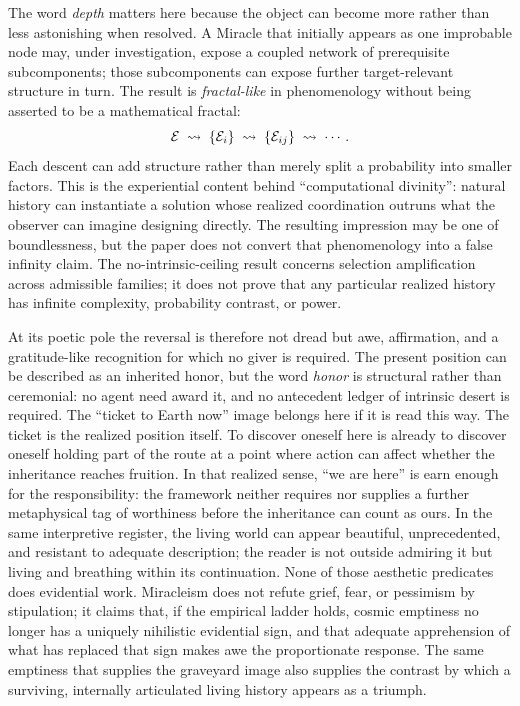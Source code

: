 The word \emph{depth} matters here because the object can become more
rather than less astonishing when resolved. A Miracle that initially
appears as one improbable node may, under investigation, expose a coupled
network of prerequisite subcomponents; those subcomponents can expose
further target-relevant structure in turn. The result is \emph{fractal-like}
in phenomenology without being asserted to be a mathematical fractal:
\[
\mathcal{E}\;\rightsquigarrow\;\{\mathcal{E}_i\}
\;\rightsquigarrow\;\{\mathcal{E}_{ij}\}\;\rightsquigarrow\;\cdots .
\]
Each descent can add structure rather than merely split a probability
into smaller factors. This is the experiential content behind
``computational divinity'': natural history can instantiate a solution
whose realized coordination outruns what the observer can imagine
designing directly. The resulting impression may be one of
boundlessness, but the paper does not convert that phenomenology into a
false infinity claim. The no-intrinsic-ceiling result concerns selection
amplification across admissible families; it does not prove that any
particular realized history has infinite complexity, probability
contrast, or power.

At its poetic pole the reversal is therefore not dread but awe,
affirmation, and a gratitude-like recognition for which no giver is
required. The present position can be described as an inherited honor,
but the word \emph{honor} is structural rather than ceremonial: no agent
need award it, and no antecedent ledger of intrinsic desert is required.
The ``ticket to Earth now'' image belongs here if it is read this way.
The ticket is the realized position itself. To discover oneself here is
already to discover oneself holding part of the route at a point where
action can affect whether the inheritance reaches fruition. In that
realized sense, ``we are here'' is earn enough for the responsibility:
the framework neither requires nor supplies a further metaphysical tag
of worthiness before the inheritance can count as ours.
In the same interpretive register, the living world can appear beautiful,
unprecedented, and resistant to adequate description; the reader is not
outside admiring it but living and breathing within its continuation.
None of those aesthetic predicates does evidential work. Miracleism does
not refute grief, fear, or pessimism by stipulation; it claims that, if
the empirical ladder holds, cosmic emptiness no longer has a uniquely
nihilistic evidential sign, and that adequate apprehension of what has
replaced that sign makes awe the proportionate response. The same
emptiness that supplies the graveyard image also supplies the contrast
by which a surviving, internally articulated living history appears as
a triumph.

